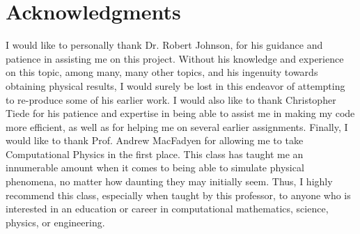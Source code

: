 \documentclass[times,12]{article}
\begin{document}
\section*{Acknowledgments}
\noindent I would like to personally thank Dr. Robert Johnson, for his guidance and patience in assisting me on this project. Without his knowledge and experience on this topic, among many, many other topics, and his ingenuity towards obtaining physical results, I would surely be lost in this endeavor of attempting to re-produce some of his earlier work. I would also like to thank Christopher Tiede for his patience and expertise in being able to assist me in making my code more efficient, as well as for helping me on several earlier assignments. Finally, I would like to thank Prof. Andrew MacFadyen for allowing me to take Computational Physics in the first place. This class has taught me an innumerable amount when it comes to being able to simulate physical phenomena, no matter how daunting they may initially seem. Thus, I highly recommend this class, especially when taught by this professor, to anyone who is interested in an education or career in computational mathematics, science, physics, or engineering.

\newpage

\end{document}
